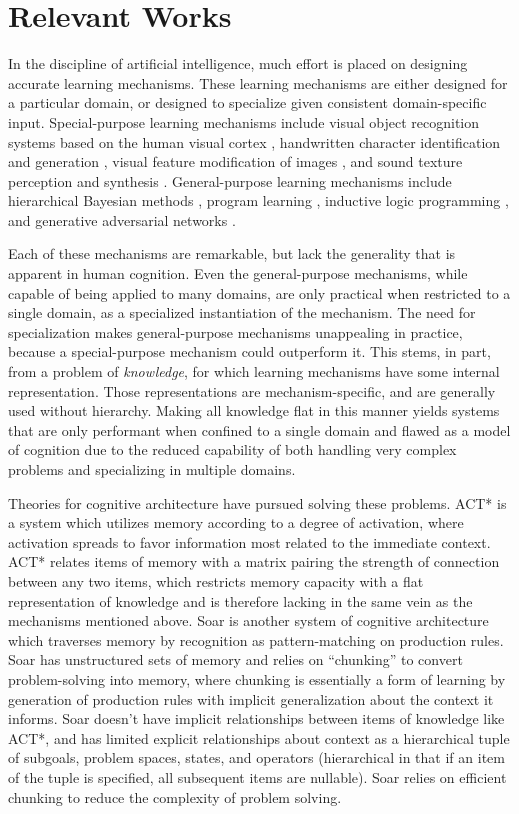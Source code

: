 \documentclass[11pt,letterpaper]{article}
\begin{document}
\section{Relevant Works}

In the discipline of artificial intelligence, much effort is placed on
designing accurate learning mechanisms. These learning mechanisms are
either designed for a particular domain, or designed to specialize
given consistent domain-specific input. Special-purpose learning mechanisms
include visual object recognition systems based on the human visual cortex
\cite{serre07}, handwritten character identification and generation
\cite{lake15}, visual feature modification of images \cite{kulkarni15}, and
sound texture perception and synthesis \cite{mcdermott11}. General-purpose
learning mechanisms include hierarchical Bayesian methods
\cite{tenenbaum01}, program learning \cite{liang10}\cite{dechter13},
inductive logic programming \cite{lavrac94}\cite{muggleton15}, and
generative adversarial networks \cite{goodfellow14}.

Each of these mechanisms are remarkable, but lack the generality that is
apparent in human cognition. Even the general-purpose mechanisms, while
capable of being applied to many domains, are only practical when restricted
to a single domain, as a specialized instantiation of the mechanism. The
need for specialization makes general-purpose mechanisms unappealing in
practice, because a special-purpose mechanism could outperform it. This
stems, in part, from a problem of \emph{knowledge}, for which learning
mechanisms have some internal representation. Those representations are
mechanism-specific, and are generally used without hierarchy. Making all
knowledge flat in this manner yields systems that are only performant when
confined to a single domain and flawed as a model of cognition due to the
reduced capability of both handling very complex problems and specializing
in multiple domains.

Theories for cognitive architecture have pursued solving these problems.
ACT* \cite{anderson83} is a system which utilizes memory according to a
degree of activation, where activation spreads to favor information most
related to the immediate context. ACT* relates items of memory with a matrix
pairing the strength of connection between any two items, which restricts
memory capacity with a flat representation of knowledge and is therefore
lacking in the same vein as the mechanisms mentioned above. Soar
\cite{newell94} is another system of cognitive architecture which traverses
memory by recognition as pattern-matching on production rules. Soar has
unstructured sets of memory and relies on ``chunking'' to convert
problem-solving into memory, where chunking is essentially a form of
learning by generation of production rules with implicit generalization
about the context it informs. Soar doesn't have implicit relationships
between items of knowledge like ACT*, and has limited explicit relationships
about context as a hierarchical tuple of subgoals, problem spaces, states,
and operators (hierarchical in that if an item of the tuple is specified,
all subsequent items are nullable). Soar relies on efficient chunking to
reduce the complexity of problem solving.
\end{document}

